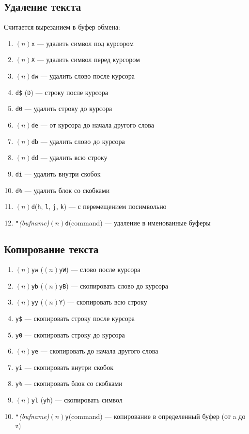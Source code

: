 \documentclass[a4paper,10pt, twocolumn]{article}
\newcommand*{\cod}[1]{\texttt{#1}}
\begin{document}
\subsection{Удаление текста}
Считается вырезанием в буфер обмена:
\begin{enumerate}
    \item $(n)$\cod{x} --- удалить символ под курсором
    \item $(n)$\cod{X} --- удалить символ перед курсором
    \item $(n)$\cod{dw} --- удалить слово после курсора
    \item \cod{d\$} (\cod{D}) --- строку после курсора
    \item \cod{d0} --- удалить строку до курсора
    \item $(n)$\cod{de} --- от курсора до начала другого слова
    \item $(n)$\cod{db} --- удалить слово до курсора
    \item $(n)$\cod{dd} --- удалить всю строку
    \item \cod{di} --- удалить внутри скобок
    \item \cod{d\%} --- удалить блок со скобками
    \item $(n)$\cod{d}(\cod{h}, \cod{l}, \cod{j}, \cod{k}) --- с перемещением посимвольно
    \item \cod{"}\textit{(bufname)}$(n)$\cod{d}(command) --- удаление в именованные буферы
\end{enumerate}

\subsection{Копирование текста}
\begin{enumerate}
    \item $(n)$\cod{yw} ($(n)$\cod{yW}) --- слово после курсора
    \item $(n)$\cod{yb} ($(n)$\cod{yB}) --- скопировать слово до курсора
    \item $(n)$\cod{yy} ($(n)$\cod{Y}) --- скопировать всю строку
    \item \cod{y\$} --- скопировать строку после курсора
    \item \cod{y0} --- скопировать строку до курсора
    \item $(n)$\cod{ye} --- скопировать до начала другого слова
    \item \cod{yi} --- скопировать внутри скобок
    \item \cod{y\%} --- скопировать блок со скобками
    \item $(n)$\cod{yl} (\cod{yh}) --- скопировать символ
    \item \cod{"}\textit{(bufname)}$(n)$\cod{y}(command) --- копирование в определенный буфер (от a до z)
\end{enumerate}
\end{document}

